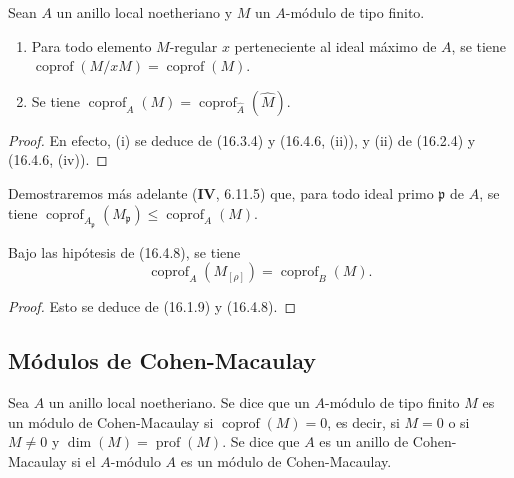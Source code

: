 \begin{proposition}[16.4.10]
\label{0.16.4.10-es}
Sean $A$ un anillo local noetheriano y $M$ un $A$-módulo de tipo finito.
\begin{enumerate}
  \item[\textup{(i)}] Para todo elemento $M$-regular $x$ perteneciente al ideal máximo
  de $A$, se tiene
  $\operatorname{coprof}(M/xM)=\operatorname{coprof}(M)$.
  \item[\textup{(ii)}] Se tiene
  $\operatorname{coprof}_A(M)=\operatorname{coprof}_{\widehat A}(\widehat M)$.
\end{enumerate}
\end{proposition}

\begin{proof}
En efecto, (i) se deduce de (16.3.4) y (16.4.6, (ii)), y (ii) de (16.2.4) y
(16.4.6, (iv)).
\end{proof}

Demostraremos más adelante (\textbf{IV}, 6.11.5) que, para todo ideal primo
$\mathfrak{p}$ de $A$, se tiene
$\operatorname{coprof}_{A_{\mathfrak{p}}}(M_{\mathfrak{p}})
\leq\operatorname{coprof}_A(M)$.

\begin{proposition}[16.4.11]
\label{0.16.4.11-es}
Bajo las hipótesis de \textup{(16.4.8)}, se tiene
\begin{equation}
\label{0.16.4.11.1-es}
\tag{16.4.11.1}
  \operatorname{coprof}_A(M_{[\rho]})=\operatorname{coprof}_B(M).
\end{equation}
\end{proposition}

\begin{proof}
Esto se deduce de (16.1.9) y (16.4.8).
\end{proof}

\subsection{Módulos de Cohen-Macaulay}
\label{subsection:0.16.5-es}

\begin{definition}[16.5.1]
\label{0.16.5.1-es}
Sea $A$ un anillo local noetheriano. Se dice que un $A$-módulo de tipo finito
$M$ es un módulo de Cohen-Macaulay si
$\operatorname{coprof}(M)=0$, es decir, si $M=0$ o si $M\neq0$ y
$\dim(M)=\operatorname{prof}(M)$. Se dice que $A$ es un
anillo de Cohen-Macaulay si el $A$-módulo $A$ es un módulo de
Cohen-Macaulay.
\end{definition}

